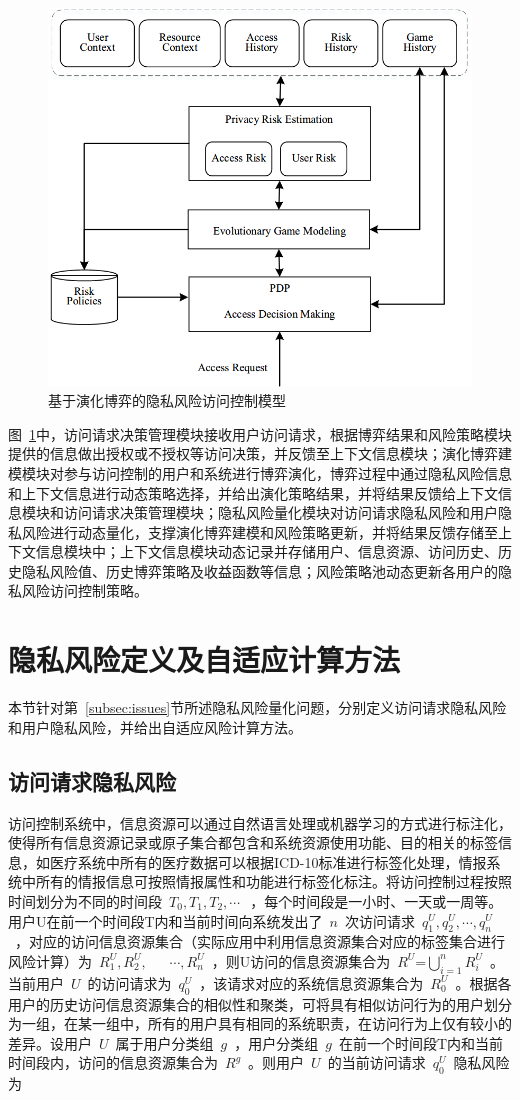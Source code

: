 \begin{figure}[htbp]
	\centering
	\includegraphics[width = 0.6\linewidth]{./figures/Evolutionary-game-Rabac.png}
	\caption{基于演化博弈的隐私风险访问控制模型}
	\label{fig:Evolutionary-game-Rabac}
\end{figure}

图~\ref{fig:Evolutionary-game-Rabac}中，访问请求决策管理模块接收用户访问请求，根据博弈结果和风险策略模块提供的信息做出授权或不授权等访问决策，并反馈至上下文信息模块；演化博弈建模模块对参与访问控制的用户和系统进行博弈演化，博弈过程中通过隐私风险信息和上下文信息进行动态策略选择，并给出演化策略结果，并将结果反馈给上下文信息模块和访问请求决策管理模块；隐私风险量化模块对访问请求隐私风险和用户隐私风险进行动态量化，支撑演化博弈建模和风险策略更新，并将结果反馈存储至上下文信息模块中；上下文信息模块动态记录并存储用户、信息资源、访问历史、历史隐私风险值、历史博弈策略及收益函数等信息；风险策略池动态更新各用户的隐私风险访问控制策略。

\section{隐私风险定义及自适应计算方法}
本节针对第~\ref{subsec:issues}节所述隐私风险量化问题，分别定义访问请求隐私风险和用户隐私风险，并给出自适应风险计算方法。
\subsection{访问请求隐私风险}

访问控制系统中，信息资源可以通过自然语言处理或机器学习的方式进行标注化，使得所有信息资源记录或原子集合都包含和系统资源使用功能、目的相关的标签信息，如医疗系统中所有的医疗数据可以根据ICD-10标准进行标签化处理，情报系统中所有的情报信息可按照情报属性和功能进行标签化标注。将访问控制过程按照时间划分为不同的时间段~${{T}_{0}},{{T}_{1}},{{T}_{2}},\cdots ~$~，每个时间段是一小时、一天或一周等。用户U在前一个时间段T内和当前时间向系统发出了~$n$~次访问请求~$q_{1}^{U},q_{2}^{U},\cdots ,q_{n}^{U}$~，对应的访问信息资源集合（实际应用中利用信息资源集合对应的标签集合进行风险计算）为~$R_{1}^{U},R_{2}^{U},~$~ ~$\cdots ,R_{n}^{U}$~，则U访问的信息资源集合为~$R_{{}}^{U}\text{=}\bigcup\nolimits_{i=1}^{n}{R_{i}^{U}}$~。当前用户~$U$~的访问请求为~$q_{0}^{U}$~，该请求对应的系统信息资源集合为~$R_{0}^{U}$~。根据各用户的历史访问信息资源集合的相似性和聚类，可将具有相似访问行为的用户划分为一组，在某一组中，所有的用户具有相同的系统职责，在访问行为上仅有较小的差异。设用户~$U$~属于用户分类组~$g$~，用户分类组~$g$~在前一个时间段T内和当前时间段内，访问的信息资源集合为~$R_{{}}^{g}$~。则用户~$U$~的当前访问请求~$q_{0}^{U}$~隐私风险为

